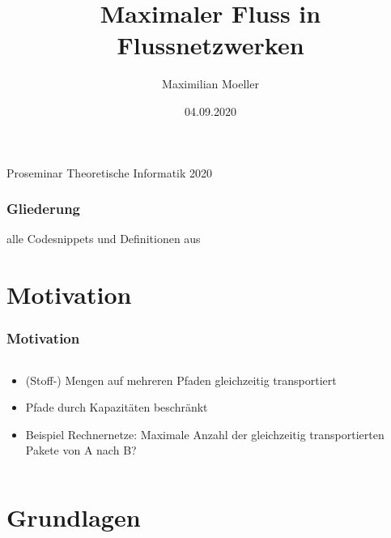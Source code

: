 \documentclass{beamer}
\author{Maximilian Moeller}
\title{Maximaler Fluss in Flussnetzwerken}
\date{04.09.2020}
\begin{document}
\begin{frame}
\maketitle
\center\large Proseminar Theoretische Informatik 2020
\end{frame}

\begin{frame}
\frametitle{Gliederung}
\tableofcontents
{}
alle Codesnippets und Definitionen aus \citep{Cormen09}
\end{frame}

\section{Motivation}
\begin{frame}
\frametitle{Motivation}
\begin{columns}
\begin{column}{.4\textwidth}
\begin{itemize}
\item (Stoff-) Mengen auf mehreren Pfaden gleichzeitig transportiert
\item Pfade durch Kapazitäten beschränkt\pause
\item Beispiel Rechnernetze: Maximale Anzahl der gleichzeitig transportierten Pakete von A nach B?
\end{itemize}
\end{column}
\begin{column}{.6\textwidth}
\end{column}
\end{columns}
\end{frame}


\section{Grundlagen}
\end{document}
